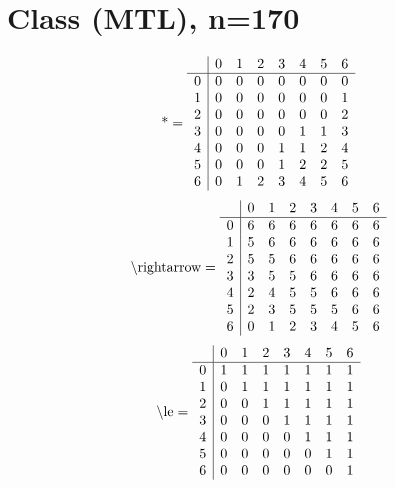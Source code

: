 \documentclass[11pt]{article}
\begin{document}
\section{Class (MTL), n=170}
\[\text{*} = 
\begin{array}{r | r r r r r r r}
 & 0 & 1 & 2 & 3 & 4 & 5 & 6 \\ \hline
0 & 0 & 0 & 0 & 0 & 0 & 0 & 0 \\
1 & 0 & 0 & 0 & 0 & 0 & 0 & 1 \\
2 & 0 & 0 & 0 & 0 & 0 & 0 & 2 \\
3 & 0 & 0 & 0 & 0 & 1 & 1 & 3 \\
4 & 0 & 0 & 0 & 1 & 1 & 2 & 4 \\
5 & 0 & 0 & 0 & 1 & 2 & 2 & 5 \\
6 & 0 & 1 & 2 & 3 & 4 & 5 & 6 \\
\end{array}
\]
\[\text{\textbackslash rightarrow} = 
\begin{array}{r | r r r r r r r}
 & 0 & 1 & 2 & 3 & 4 & 5 & 6 \\ \hline
0 & 6 & 6 & 6 & 6 & 6 & 6 & 6 \\
1 & 5 & 6 & 6 & 6 & 6 & 6 & 6 \\
2 & 5 & 5 & 6 & 6 & 6 & 6 & 6 \\
3 & 3 & 5 & 5 & 6 & 6 & 6 & 6 \\
4 & 2 & 4 & 5 & 5 & 6 & 6 & 6 \\
5 & 2 & 3 & 5 & 5 & 5 & 6 & 6 \\
6 & 0 & 1 & 2 & 3 & 4 & 5 & 6 \\
\end{array}
\]
\[\text{\textbackslash le} = 
\begin{array}{r | r r r r r r r}
 & 0 & 1 & 2 & 3 & 4 & 5 & 6 \\ \hline
0 & 1 & 1 & 1 & 1 & 1 & 1 & 1 \\
1 & 0 & 1 & 1 & 1 & 1 & 1 & 1 \\
2 & 0 & 0 & 1 & 1 & 1 & 1 & 1 \\
3 & 0 & 0 & 0 & 1 & 1 & 1 & 1 \\
4 & 0 & 0 & 0 & 0 & 1 & 1 & 1 \\
5 & 0 & 0 & 0 & 0 & 0 & 1 & 1 \\
6 & 0 & 0 & 0 & 0 & 0 & 0 & 1 \\
\end{array}
\]
\end{document}
